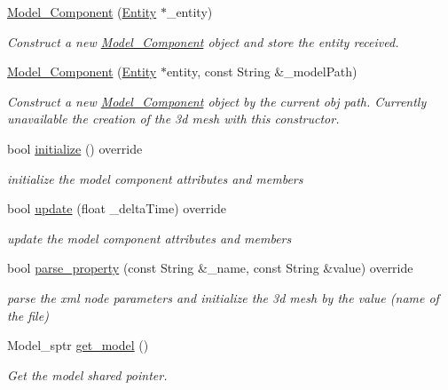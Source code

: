 \begin{DoxyCompactItemize}
\item 
\mbox{\hyperlink{classbanita_1_1_model___component_a2f9baa86605d6d152e69cd73af41cf7b}{Model\+\_\+\+Component}} (\mbox{\hyperlink{classbanita_1_1_entity}{Entity}} $\ast$\+\_\+entity)
\begin{DoxyCompactList}\small\item\em Construct a new \mbox{\hyperlink{classbanita_1_1_model___component}{Model\+\_\+\+Component}} object and store the entity received. \end{DoxyCompactList}\item 
\mbox{\hyperlink{classbanita_1_1_model___component_aa8bdeb97075af832ea0c0f32b302e799}{Model\+\_\+\+Component}} (\mbox{\hyperlink{classbanita_1_1_entity}{Entity}} $\ast$entity, const String \&\+\_\+model\+Path)
\begin{DoxyCompactList}\small\item\em Construct a new \mbox{\hyperlink{classbanita_1_1_model___component}{Model\+\_\+\+Component}} object by the current obj path. Currently unavailable the creation of the 3d mesh with this constructor. \end{DoxyCompactList}\item 
bool \mbox{\hyperlink{classbanita_1_1_model___component_af87c47483437405822718949a448bc14}{initialize}} () override
\begin{DoxyCompactList}\small\item\em initialize the model component attributes and members \end{DoxyCompactList}\item 
bool \mbox{\hyperlink{classbanita_1_1_model___component_ab8acac6bf05bc01a8529235904b81a5b}{update}} (float \+\_\+delta\+Time) override
\begin{DoxyCompactList}\small\item\em update the model component attributes and members \end{DoxyCompactList}\item 
bool \mbox{\hyperlink{classbanita_1_1_model___component_a1a6acbf643bd87acabfc2a31b7be4db8}{parse\+\_\+property}} (const String \&\+\_\+name, const String \&value) override
\begin{DoxyCompactList}\small\item\em parse the xml node parameters and initialize the 3d mesh by the value (name of the file) \end{DoxyCompactList}\item 
Model\+\_\+sptr \mbox{\hyperlink{classbanita_1_1_model___component_ae0c1a224521a196fad83dcc09e34097b}{get\+\_\+model}} ()
\begin{DoxyCompactList}\small\item\em Get the model shared pointer. \end{DoxyCompactList}\end{DoxyCompactItemize}
